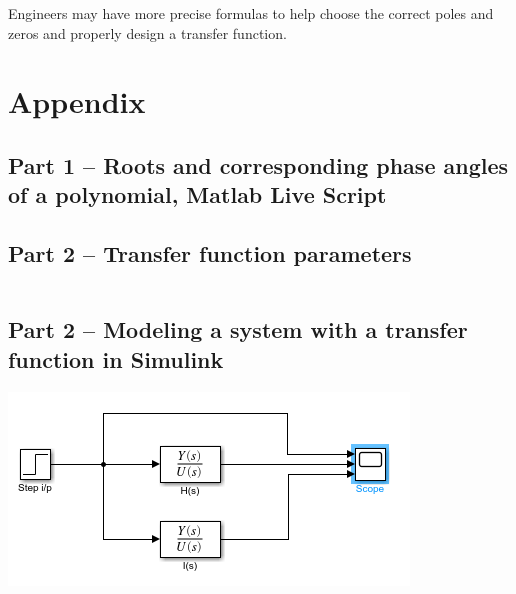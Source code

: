 \documentclass[12pt]{article}
\begin{document}
Engineers may have more precise formulas to help choose the correct poles and zeros and properly design a transfer function.


\newpage
\appendix
\section{Appendix}
\subsection{Part 1 -- Roots and corresponding phase angles of a polynomial, Matlab Live Script}



\subsection{Part 2 -- Transfer function parameters}

\inputminted[]{matlab}{part02_01_transfer_function_params.m}

\subsection{Part 2 -- Modeling a system with a transfer function in Simulink}

\includegraphics[width=\linewidth]{part02_02_modeling_transfer_function_system_slx.png}
\end{document}
